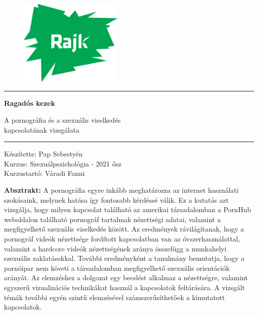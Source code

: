 \documentclass[12pt,a4paper]{article}
\begin{document}

\begin{figure}[h]
\includegraphics[width=50mm]{figures/rajk_green.png}
\end{figure}

\noindent\rule{\textwidth}{1pt}
\vspace{1mm}
\begin{center}
{\Huge \textbf{Ragadós kezek}}

{\large A pornográfia és a szexuális viselkedés\\
kapcsolatának vizsgálata}
\end{center}
\noindent\rule{\textwidth}{1pt}

\begin{center}
{\large Készítette: Pap Sebestyén}\\
{\large Kurzus: Szexuálpszichológia - 2021 ősz}\\
{\large Kurzustartó: Váradi Fanni}
\end{center}

\vspace{10mm}

\noindent \textbf{Absztrakt:} A pornográfia egyre inkább meghatározza az internet használati szokásaink, melynek hatása így fontosabb kérdéssé válik. Ez a kutatás azt vizsgálja, hogy milyen kapcsolat található az amerikai társadalomban a PornHub weboldalon található pornográf tartalmak nézettségi adatai, valamint a megfigyelhető szexuális viselkedés között. Az eredmények rávilágítanak, hogy a pornográf videók nézettsége fordított kapcsolatban van az óvszerhasználattal, valamint a hardcore videók nézettségének aránya összefügg a munkahelyi szexuális zaklatásokkal. További eredményként a tanulmány bemutatja, hogy a pornóipar nem követi a társadalomban megfigyelhető szexuális orientációk arányát. Az elemzéshez a dolgozat egy becslést alkalmaz a nézettségre, valamint egyszerű vizualizációs technikákat használ a kapcsolatok feltárására. A vizsgált témák további egyén szintű elemzésével számszerűsíthetőek a kimutatott kapcsolatok.
\end{document}
